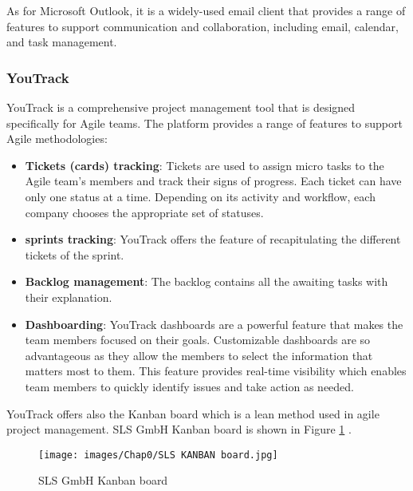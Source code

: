 As for Microsoft Outlook, it is a widely-used email client that provides a range of features to support communication and collaboration, including email, calendar, and task management.

\subsubsection{YouTrack}

YouTrack is a comprehensive project management tool that is designed specifically for Agile teams. The platform provides a range of features to support Agile methodologies:


\begin{itemize}
    \item \textbf{Tickets (cards) tracking}: Tickets are used to assign micro tasks to the Agile team's members and track their signs of progress.
    Each ticket can have only one status at a time. Depending on its activity and workflow, each company chooses the appropriate set of statuses.
    
    \item \textbf{sprints tracking}: YouTrack offers the feature of recapitulating the different tickets of the sprint.
    \item \textbf{Backlog management}: The backlog contains all the awaiting tasks with their explanation.

    \item \textbf{Dashboarding}: YouTrack dashboards are a powerful feature that makes the team members focused on their goals. Customizable dashboards are so advantageous as they allow the members to select the information that matters most to them.
    This feature provides real-time visibility which enables team members to quickly identify issues and take action as needed.
\end{itemize}

YouTrack offers also the Kanban board which is a lean method used in agile project management.
SLS GmbH Kanban board is shown in Figure \ref{Kanban}   .

\begin{figure}[H]
\begin{center}
\texttt{[image: images/Chap0/SLS KANBAN board.jpg]}\\
\caption{SLS GmbH Kanban board}
\label{Kanban}
\end{center}
\end{figure} 

